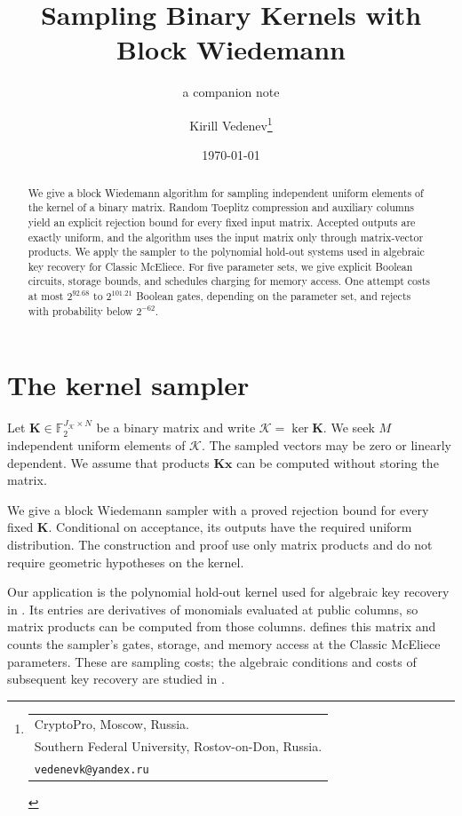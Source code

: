\documentclass[b5paper, 10pt, abstract=true, captions=tableheading]{scrartcl}
\theoremstyle{plain}
\theoremstyle{definition}
\newcommand{\FF}{\mathds{F}}
\renewcommand{\vec}[1]{\symbf{#1}}
\newcommand{\mat}[1]{\symbf{#1}}
\newcommand{\calK}{\mathcal{K}}
\newcommand*\email[1]{\texttt{#1}}
\begin{document}
\title{Sampling Binary Kernels with Block Wiedemann}
\subtitle{a companion note}
\date{\today}
\author{%
  Kirill Vedenev\thanks{%
    \begin{tabular}[t]{@{}l@{}}
      CryptoPro, Moscow, Russia.\\
      Southern Federal University, Rostov-on-Don, Russia.\\
      \email{vedenevk@yandex.ru}
    \end{tabular}%
  }%
}
\publishers{}
\maketitle


\begin{abstract}
We give a block Wiedemann algorithm for sampling independent uniform
elements of the kernel of a binary matrix. Random Toeplitz compression
and auxiliary columns yield an explicit rejection bound for every fixed
input matrix. Accepted outputs are exactly uniform, and the algorithm
uses the input matrix only through matrix-vector products. We apply the
sampler to the polynomial hold-out systems used in algebraic key recovery
for Classic McEliece. For five parameter sets, we give explicit Boolean
circuits, storage bounds, and schedules charging for memory access. One
attempt costs at most $2^{92.68}$ to $2^{101.21}$ Boolean gates, depending
on the parameter set, and rejects with probability below $2^{-62}$.
\end{abstract}

\setcounter{tocdepth}{1}
{\hypersetup{linkcolor=black}\tableofcontents}

\section{The kernel sampler}
\label{app:wiedemann}
Let $\mat K\in\FF_2^{J_{\calK}\times N}$ be a binary matrix and write
$\calK=\ker\mat K$. We seek $M$ independent uniform elements of $\calK$.
The sampled vectors may be zero or linearly dependent. We assume that
products $\mat K\vec x$ can be computed without storing the matrix.

We give a block Wiedemann sampler
\cite{Wiedemann1986,Coppersmith1994} with a proved rejection bound for
every fixed $\mat K$. Conditional on acceptance, its outputs have the
required uniform distribution. The construction and proof use only
matrix products and do not require geometric hypotheses on the kernel.

Our application is the polynomial hold-out kernel used for algebraic key
recovery in \cite{Vedenev2026KeyRecovery}. Its entries are derivatives of
monomials evaluated at public columns, so matrix products can be computed
from those columns.  defines this matrix and
counts the sampler's gates, storage, and memory access at the Classic
McEliece parameters. These are sampling costs; the algebraic conditions
and costs of subsequent key recovery are studied in
\cite{Vedenev2026KeyRecovery}.
\end{document}
